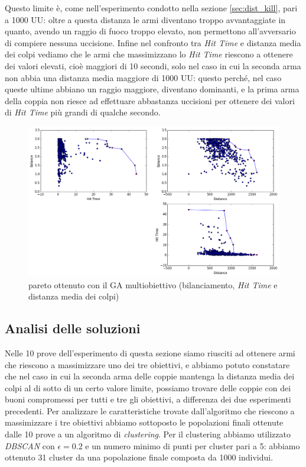\documentclass[12pt, italian]{toptesi}
\begin{document}
Questo limite è, come nell'esperimento condotto nella sezione \ref{sec:dist_kill}, pari a 1000 UU: oltre a questa distanza le armi diventano troppo avvantaggiate in quanto, avendo un raggio di fuoco troppo elevato, non permettono all'avversario di compiere nessuna uccisione.
Infine nel confronto tra \emph{Hit Time} e distanza media dei colpi vediamo che le armi che massimizzano lo \emph{Hit Time} riescono a ottenere dei valori elevati, cioè maggiori di 10 secondi, solo nel caso in cui la seconda arma non abbia una distanza media maggiore di 1000 UU: questo perché, nel caso queste ultime abbiano un raggio maggiore, diventano dominanti, e la prima arma della coppia non riesce ad effettuare abbastanza uccisioni per ottenere dei valori di \emph{Hit Time} più grandi di qualche secondo.

\begin{figure}[tp]
\centering
\includegraphics[width=1.0\textwidth]{pareto_delta_dist}
\caption{pareto ottenuto con il GA multiobiettivo (bilanciamento, \emph{Hit Time} e distanza media dei colpi)}
\label{fig:pareto_delta_dist}
\end{figure}

\subsection{Analisi delle soluzioni}

Nelle 10 prove dell'esperimento di questa sezione siamo riusciti ad ottenere armi che riescono a massimizzare uno dei tre obiettivi, e abbiamo potuto constatare che nel caso in cui la seconda arma delle coppie mantenga la distanza media dei colpi al di sotto di un certo valore limite, possiamo trovare delle coppie con dei buoni compromessi per tutti e tre gli obiettivi, a differenza dei due esperimenti precedenti.
Per analizzare le caratteristiche trovate dall'algoritmo che riescono a massimizzare i tre obiettivi abbiamo sottoposto le popolazioni finali ottenute dalle 10 prove a un algoritmo di \emph{clustering}.
Per il clustering abbiamo utilizzato \emph{DBSCAN} con $\epsilon = 0.2$ e un numero minimo di punti per cluster pari a 5: abbiamo ottenuto 31 cluster da una popolazione finale composta da 1000 individui.
\end{document}
